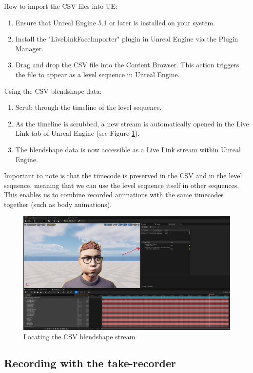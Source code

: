 \documentclass{uva-inf-article}
\begin{document}
How to import the CSV files into UE:
\begin{enumerate}
    \item Ensure that Unreal Engine 5.1 or later is installed on your system.
    \item Install the "LiveLinkFaceImporter" plugin in Unreal Engine via the Plugin Manager.
    \item Drag and drop the CSV file into the Content Browser. This action triggers the file to appear as a level sequence in Unreal Engine.
\end{enumerate}

Using the CSV blendshape data:
\begin{enumerate}
    \item Scrub through the timeline of the level sequence.
    \item As the timeline is scrubbed, a new stream is automatically opened in the Live Link tab of Unreal Engine (see Figure \ref{fig:csvBlendshapes}).
    \item The blendshape data is now accessible as a Live Link stream within Unreal Engine.
\end{enumerate}

Important to note is that the timecode is preserved in the CSV and in the level sequence, meaning that we can use the level sequence itself in other sequences. This enables us to combine recorded animations with the same timecodes together (such as body animations).
\begin{figure}[hbt!]
    \centering
    \includegraphics[width=\textwidth]{imgs/csvblendshapes.png}
    \caption{Locating the CSV blendshape stream}
    \label{fig:csvBlendshapes}
\end{figure}

\subsection{Recording with the take-recorder}
\end{document}
